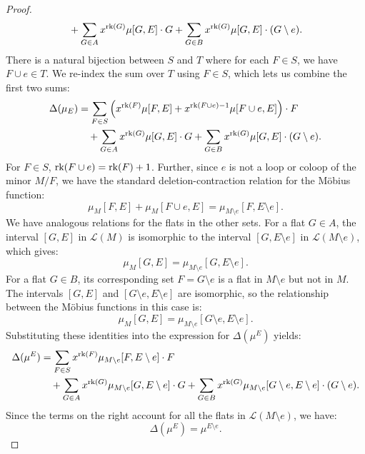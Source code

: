 \documentclass[11pt]{article}
\newcommand{\calL}{\mathcal{L}}
\newcommand{\rank}{\normalfont\text{rk}}
\theoremstyle{remark}
\begin{document}
\begin{proof}
\begin{align*}
                      & \quad+ \sum_{G \in A} x^{\rank(G)}\mu[G,E]\cdot G + \sum_{G \in B} x^{\rank(G)}\mu[G,E]\cdot (G\setminus e).
    \end{align*}
    There is a natural bijection between $S$ and $T$ where for each $F \in S$, we have $F \cup e \in T$. We re-index the sum over $T$ using $F \in S$, which lets us combine the first two sums:
    \begin{align*}
        \Delta(\mu_E) & = \sum_{F \in S} \left( x^{\rank(F)}\mu[F,E] + x^{\rank(F\cup e)-1}\mu[F\cup e,E] \right) \cdot F            \\
                      & \quad+ \sum_{G \in A} x^{\rank(G)}\mu[G,E]\cdot G + \sum_{G \in B} x^{\rank(G)}\mu[G,E]\cdot (G\setminus e).
    \end{align*}
    For $F\in S$, $\rank(F\cup e) = \rank(F) + 1$. Further, since $e$ is not a loop or coloop of the minor $M/F$, we have the standard deletion-contraction relation for the Möbius function:
    \[
        \mu_M[F,E] + \mu_M[F\cup e,E] = \mu_{M\setminus e}[F,E\setminus e].
    \]
    We have analogous relations for the flats in the other sets. For a flat $G \in A$, the interval $[G,E]$ in $\calL(M)$ is isomorphic to the interval $[G, E\setminus e]$ in $\calL(M\setminus e)$, which gives:
    \[
        \mu_M[G,E] = \mu_{M\setminus e}[G,E\setminus e].
    \]
    For a flat $G \in B$, its corresponding set $F = G\setminus e$ is a flat in $M\setminus e$ but not in $M$.
    The intervals $[G, E]$ and $[G\setminus e, E\setminus e]$ are isomorphic, so the relationship between the Möbius functions in this case is:
    \[
        \mu_M[G,E] = \mu_{M\setminus e}[G\setminus e,E\setminus e].
    \]
    Substituting these identities into the expression for $\Delta(\mu^E)$ yields:
    \begin{align*}
        \Delta(\mu^E) & = \sum_{F \in S} x^{\rank(F)}\mu_{M\setminus e}[F,E\setminus e]\cdot F                                                                                                      \\
                      & \quad+ \sum_{G \in A} x^{\rank(G)}\mu_{M\setminus e}[G,E\setminus e]\cdot G + \sum_{G \in B} x^{\rank(G)}\mu_{M\setminus e}[G\setminus e,E\setminus e]\cdot (G\setminus e).
    \end{align*}
    Since the terms on the right account for all the flats in $\calL(M\setminus e)$, we have:
    \[
        \Delta(\mu^E) = \mu^{E\setminus e}.
    \]
\end{proof}
\end{document}

